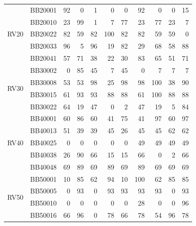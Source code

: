 \begin{table}[htbp]
\begin{tabular}{|c|l|r|r|r|r|r|r|r|r|r|}
		\hline
		\hline
		\multirow{5}{*}{RV20} & BB20001 & 92    & 0     & 1     & 0     & 0     & 92    & 0     & 0     & 15 \\
		\cline{2-11}          & BB20010 & 23    & 99    & 1     & 7     & 77    & 23    & 77    & 23    & 7 \\
		\cline{2-11}          & BB20022 & 82    & 59    & 82    & 100   & 82    & 82    & 59    & 59    & 0 \\
		\cline{2-11}          & BB20033 & 96    & 5     & 96    & 19    & 82    & 29    & 68    & 58    & 88 \\
		\cline{2-11}          & BB20041 & 57    & 71    & 38    & 22    & 30    & 83    & 65    & 51    & 71 \\
		\hline
		\hline
		\multirow{4}{*}{RV30} & BB30002 & 0     & 85    & 45    & 7     & 45    & 0     & 7     & 7     & 7 \\
		\cline{2-11}          & BB30008 & 53    & 53    & 98    & 25    & 98    & 98    & 100   & 38    & 90 \\
		\cline{2-11}          & BB30015 & 61    & 93    & 93    & 88    & 88    & 61    & 100   & 88    & 88 \\
		\cline{2-11}          & BB30022 & 64    & 19    & 47    & 0     & 2     & 47    & 19    & 5     & 84 \\
		\hline
		\hline
		\multirow{5}{*}{RV40} & BB40001 & 60    & 86    & 60    & 41    & 75    & 41    & 97    & 60    & 97 \\
		\cline{2-11}          & BB40013 & 51    & 39    & 39    & 45    & 26    & 45    & 45    & 62    & 62 \\
		\cline{2-11}          & BB40025 & 0     & 0     & 0     & 0     & 0     & 49    & 49    & 49    & 49 \\
		\cline{2-11}          & BB40038 & 26    & 90    & 66    & 15    & 15    & 66    & 0     & 2     & 66 \\
		\cline{2-11}          & BB40048 & 69    & 89    & 69    & 89    & 69    & 89    & 69    & 69    & 69 \\
		\hline
		\hline
		\multirow{4}{*}{RV50} & BB50001 & 10    & 85    & 62    & 94    & 10    & 100   & 62    & 85    & 85 \\
		\cline{2-11}          & BB50005 & 0     & 93    & 0     & 93    & 93    & 93    & 93    & 0     & 93 \\
		\cline{2-11}          & BB50010 & 0     & 0     & 0     & 0     & 0     & 28    & 0     & 0     & 96 \\
		\cline{2-11}          & BB50016 & 66    & 96    & 0     & 78    & 66    & 78    & 54    & 96    & 78 \\
		\hline
	\end{tabular}%
	\label{tab:balibase_good_solutions}%
\end{table}%

